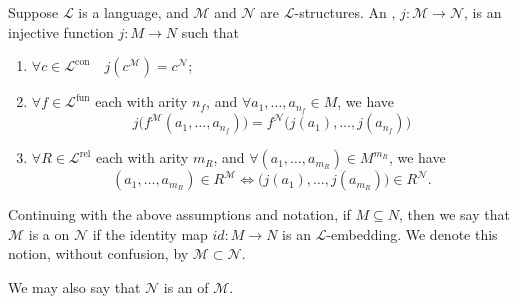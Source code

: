 \documentclass[notoc,notitlepage]{tufte-book}
\DeclareMathOperator{\con}{con}
\DeclareMathOperator{\fun}{fun}
\DeclareMathOperator{\rel}{rel}
\begin{document}
\begin{defn}\label{defn:l_embedding}
  Suppose $\mathcal{L}$ is a language, and $\mathcal{M}$ and $\mathcal{N}$ are $\mathcal{L}$-structures. An , $j : \mathcal{M} \to \mathcal{N}$, is an injective function $j : M \to N$ such that
  \begin{enumerate}
    \item $\forall c \in \mathcal{L}^{\con} \quad j(c^\mathcal{M}) = c^\mathcal{N}$;
    \item $\forall f \in \mathcal{L}^{\fun}$ each with arity $n_f$, and $\forall a_1, \ldots, a_{n_f} \in M$, we have
      \begin{equation*}
        j\big( f^\mathcal{M}(a_1, \ldots, a_{n_f}) \big) = f^\mathcal{N} \big( j(a_1), \ldots, j(a_{n_f}) \big)
      \end{equation*}
    \item $\forall R \in \mathcal{L}^{\rel}$ each with arity $m_R$, and $\forall (a_1, \ldots, a_{m_R}) \in M^{m_R}$, we have
      \begin{equation*}
        (a_1, \ldots, a_{m_R}) \in R^\mathcal{M} \iff \big( j(a_1), \ldots, j(a_{m_R}) \big) \in R^\mathcal{N}.
      \end{equation*}
  \end{enumerate}
\end{defn}

\begin{defn}[Substructure]\label{defn:substructure}
  Continuing with the above assumptions and notation, if $M \subseteq N$, then we say that $\mathcal{M}$ is a  on $\mathcal{N}$ if the identity map $id : M \to N$ is an $\mathcal{L}$-embedding. We denote this notion, without confusion, by $\mathcal{M} \subset \mathcal{N}$.

  We may also say that $\mathcal{N}$ is an  of $\mathcal{M}$.
\end{defn}




\appendix

\backmatter\

\pagestyle{plain}



\printindex
\end{document}
